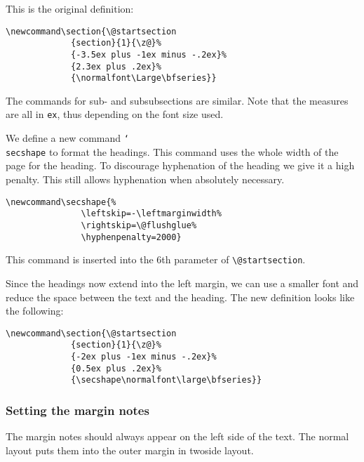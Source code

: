 \documentclass[twoside,a4paper]{refart}
\DeclareRobustCommand\cs[1]{\texttt{\char`\\#1}}
\begin{document}
This is the original definition:\nopagebreak
\begin{verbatim}
\newcommand\section{\@startsection
             {section}{1}{\z@}%
             {-3.5ex plus -1ex minus -.2ex}%
             {2.3ex plus .2ex}%
             {\normalfont\Large\bfseries}}
\end{verbatim}

The commands for sub- and subsubsections are similar. Note that the 
measures are all in \texttt{ex}, thus depending on the font size used.

We define a new command \cs{secshape} to format the headings. This 
command uses the whole width of the page for the heading. To discourage 
hyphenation of the heading we give it a high penalty. This still 
allows hyphenation when absolutely necessary.

\begin{verbatim}
\newcommand\secshape{%
               \leftskip=-\leftmarginwidth%
               \rightskip=\@flushglue%
               \hyphenpenalty=2000}
\end{verbatim}

This command is inserted into the 6th parameter of \verb|\@startsection|.

Since the headings now extend into the left margin, we can use a 
smaller font and reduce the space between the text and the heading. The 
new definition looks like the following:\nopagebreak
\begin{verbatim}
\newcommand\section{\@startsection
             {section}{1}{\z@}%
             {-2ex plus -1ex minus -.2ex}%
             {0.5ex plus .2ex}%
             {\secshape\normalfont\large\bfseries}}
\end{verbatim}

\vspace{0pt plus 1cm}

\subsubsection{Setting the margin notes}

The margin notes should always appear on the left side of the text. 
The normal layout puts them into the outer margin in twoside layout.
\end{document}
